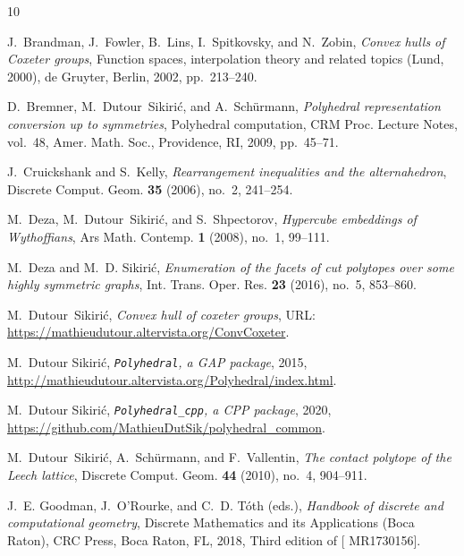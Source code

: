 \documentclass[12pt]{amsart}
\begin{document}
\providecommand{\bysame}{\leavevmode\hbox to3em{\hrulefill}\thinspace}
\providecommand{\MR}{\relax\ifhmode\unskip\space\fi MR }
\providecommand{\MRhref}[2]{%
  \href{http://www.ams.org/mathscinet-getitem?mr=#1}{#2}
}
\providecommand{\href}[2]{#2}
\begin{thebibliography}{10}

J.~Brandman, J.~Fowler, B.~Lins, I.~Spitkovsky, and N.~Zobin, \emph{Convex
  hulls of {C}oxeter groups}, Function spaces, interpolation theory and related
  topics ({L}und, 2000), de Gruyter, Berlin, 2002, pp.~213--240.

D.~Bremner, M.~Dutour~Sikiri\'{c}, and A.~Sch\"{u}rmann, \emph{Polyhedral
  representation conversion up to symmetries}, Polyhedral computation, CRM
  Proc. Lecture Notes, vol.~48, Amer. Math. Soc., Providence, RI, 2009,
  pp.~45--71.

J.~Cruickshank and S.~Kelly, \emph{Rearrangement inequalities and the
  alternahedron}, Discrete Comput. Geom. \textbf{35} (2006), no.~2, 241--254.

M.~Deza, M.~Dutour~Sikiri\'{c}, and S.~Shpectorov, \emph{Hypercube embeddings
  of {W}ythoffians}, Ars Math. Contemp. \textbf{1} (2008), no.~1, 99--111.

M.~Deza and M.~D. Sikiri\'c, \emph{Enumeration of the facets of cut polytopes
  over some highly symmetric graphs}, Int. Trans. Oper. Res. \textbf{23}
  (2016), no.~5, 853--860.

M.~Dutour~Sikiri\'c, \emph{Convex hull of coxeter groups}, URL:
  \url{https://mathieudutour.altervista.org/ConvCoxeter}.

M.~{D}utour Sikiri\'c, \emph{{\tt Polyhedral}, a {GAP} package}, 2015,
  \url{http://mathieudutour.altervista.org/Polyhedral/index.html}.

M.~{D}utour Sikiri\'c, \emph{{\tt Polyhedral\_cpp}, a {CPP} package}, 2020,
  \url{https://github.com/MathieuDutSik/polyhedral_common}.

M.~Dutour~Sikiri{\'c}, A.~Sch{\"u}rmann, and F.~Vallentin, \emph{The contact
  polytope of the {L}eech lattice}, Discrete Comput. Geom. \textbf{44} (2010),
  no.~4, 904--911.

J.~E. Goodman, J.~O'Rourke, and C.~D. T\'{o}th (eds.), \emph{Handbook of
  discrete and computational geometry}, Discrete Mathematics and its
  Applications (Boca Raton), CRC Press, Boca Raton, FL, 2018, Third edition of
  [ MR1730156].


\end{thebibliography}
\end{document}
